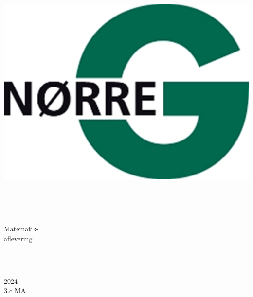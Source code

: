 \documentclass[12pt,x11names,a4paper]{article}
\begin{document}
%

\begin{titlepage}

\begin{minipage}{0.27\textwidth}

\end{minipage}
\begin{minipage}{0.73\textwidth}
\begin{center}
\phantom{h} \vspace{1cm}\\
\hspace{4cm}
\includegraphics[scale = 1]{Billeder/Norreg.png} \\
\phantom{h} \vspace{5cm}\\
\rule{0.7\textwidth}{0.3mm}\\
\phantom{h}\\
{\fontsize{50}{60}\selectfont Matematik-\\aflevering}\\
\phantom{h}\\
\rule{0.7\textwidth}{0.3mm}\\
\Large 2024\\
\Large 3.c MA

\end{center}
\end{minipage}
\end{titlepage}
\end{document}
